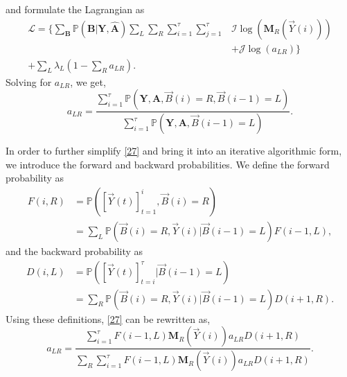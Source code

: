 \documentclass[10pt,twocolumn]{IEEEtran}
\newcommand{\nm}[1]{}
\begin{document}
and formulate the Lagrangian as
\begin{equation}\label{26}
    \begin{aligned}
        \mathcal{L}=\Big\{\sum_{\mathbf{B}}\mathbb{P}(\mathbf{B}|\mathbf{Y},\hat{\mathbf{A}})\sum_{L}\sum_{R}\sum_{i=1}^{\tau}\sum_{j=1}^{\tau}&\mathcal{I}\log(\mathbf{M}_R(\vec{Y}(i)))\\
        &+\mathcal{J}\log(a_{LR})\Big\}\\
        +\sum_{L}\lambda_L(1-\sum_Ra_{LR}).
    \end{aligned}
\end{equation}
Solving for $a_{LR}$, we get,
\begin{equation}\label{27}
    a_{LR} = \frac{\sum_{i=1}^{\tau}\mathbb{P}(\mathbf{Y},\mathbf{A},\vec{B}(i)=R,\vec{B}(i-1)=L)}{\sum_{i=1}^{\tau}\mathbb{P}(\mathbf{Y},\mathbf{A},\vec{B}(i-1)=L)}.
\end{equation}
\nm{this is pretty standard HMM stuff, no need to repeat the derivations.. just name a relevant reference and provide the mathematical steps of the algorithm specialized to your scenario, but without going through all derivations..}
In order to further simplify \eqref{27} and bring it into an iterative algorithmic form, we introduce the forward and backward probabilities. We define the forward probability as
\begin{equation}\label{28}
    \begin{aligned}
        F(i,R) &= \mathbb{P}([\vec{Y}(t)]_{t=1}^{i},\vec{B}(i)=R)\\
        &= 
        \sum_{L}\mathbb{P}(\vec{B}(i)=R,\vec{Y}(i)|\vec{B}(i-1)=L)F(i-1,L),
    \end{aligned}
\end{equation}
and the backward probability as
\begin{equation}\label{29}
    \begin{aligned}
        D(i,L) &= \mathbb{P}([\vec{Y}(t)]_{t=i}^{\tau}|\vec{B}(i-1)=L)\\
        &= \sum_{R}\mathbb{P}(\vec{B}(i)=R,\vec{Y}(i)|\vec{B}(i-1)=L)D(i+1,R).
    \end{aligned}
\end{equation}
Using these definitions, \eqref{27} can be rewritten as,
\begin{equation}\label{30}
    a_{LR} = \frac{\sum_{i=1}^{\tau}F(i-1,L)\mathbf{M}_R(\vec{Y}(i))a_{LR}D(i+1,R)}{\sum_R\sum_{i=1}^{\tau}F(i-1,L)\mathbf{M}_R(\vec{Y}(i))a_{LR}D(i+1,R)}.
\end{equation}
\nm{why is $a_{LR}$ appearing on both sides of the equation?}
\end{document}

